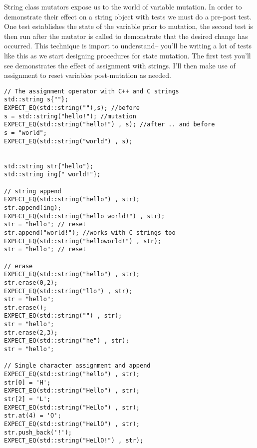 \documentclass[]{tufte-handout}
\begin{document}
String class mutators expose us to the world of variable mutation. In order to demonstrate their effect on a string object with tests we must do a pre-post test. One test establishes the state of the variable prior to mutation, the second test is then run after the mutator is called to demonstrate that the desired change has occurred. This technique is import to understand-- you'll be writing a lot of tests like this as we start designing procedures for state mutation.  The first test you'll see demonstrates the effect of assignment\sidenote{$=$} with strings.  I'll then make use of assignment to reset variables post-mutation as needed.
\begin{verbatim}
// The assignment operator with C++ and C strings
std::string s{""};
EXPECT_EQ(std::string(""),s); //before
s = std::string("hello!"); //mutation
EXPECT_EQ(std::string("hello!") , s); //after .. and before
s = "world";
EXPECT_EQ(std::string("world") , s);


std::string str{"hello"};
std::string ing{" world!"};

// string append
EXPECT_EQ(std::string("hello") , str);
str.append(ing);
EXPECT_EQ(std::string("hello world!") , str);
str = "hello"; // reset
str.append("world!"); //works with C strings too
EXPECT_EQ(std::string("helloworld!") , str);
str = "hello"; // reset

// erase
EXPECT_EQ(std::string("hello") , str);
str.erase(0,2);
EXPECT_EQ(std::string("llo") , str);
str = "hello";
str.erase();
EXPECT_EQ(std::string("") , str);
str = "hello";
str.erase(2,3);
EXPECT_EQ(std::string("he") , str);
str = "hello";

// Single character assignment and append
EXPECT_EQ(std::string("hello") , str);
str[0] = 'H';
EXPECT_EQ(std::string("Hello") , str);
str[2] = 'L';
EXPECT_EQ(std::string("HeLlo") , str);
str.at(4) = 'O';
EXPECT_EQ(std::string("HeLlO") , str);
str.push_back('!');
EXPECT_EQ(std::string("HeLlO!") , str);
\end{verbatim}
\end{document}
